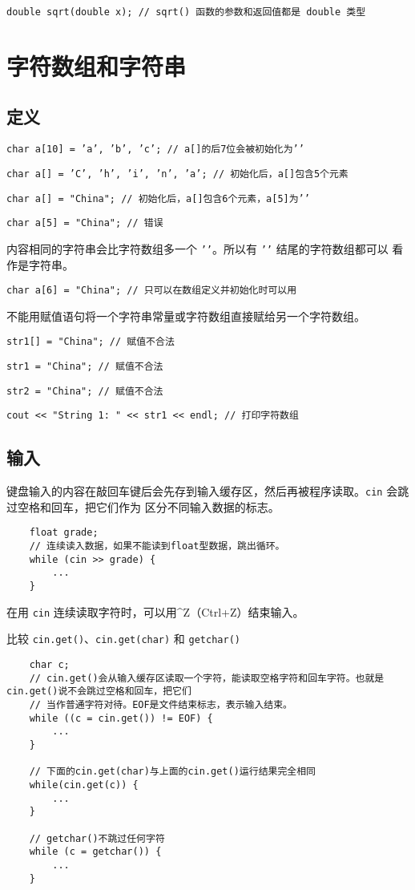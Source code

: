 \documentclass[UTF8]{ctexart}
\begin{document}
\texttt{double sqrt(double x);         // sqrt() 函数的参数和返回值都是 double 类型}

\section{字符数组和字符串}
\subsection{定义}
\texttt{char a[10] = {'a', 'b', 'c'};          // a[]的后7位会被初始化为'\0'}

\texttt{char a[] = {'C', 'h', 'i', 'n', 'a'};  // 初始化后，a[]包含5个元素}

\texttt{char a[] = "China";    // 初始化后，a[]包含6个元素，a[5]为'\0'}

\texttt{char a[5] = "China";   // 错误}

内容相同的字符串会比字符数组多一个 \texttt{'\0'}。所以有 \texttt{'\0'} 结尾的字符数组都可以
看作是字符串。

\texttt{char a[6] = "China";   // 只可以在数组定义并初始化时可以用}

不能用赋值语句将一个字符串常量或字符数组直接赋给另一个字符数组。

\texttt{str1[] = "China";      // 赋值不合法}

\texttt{str1 = "China";        // 赋值不合法}

\texttt{str2 = "China";        // 赋值不合法}

\texttt{cout << "String 1: " << str1 << endl; // 打印字符数组}

\subsection{输入}
键盘输入的内容在敲回车键后会先存到输入缓存区，然后再被程序读取。\texttt{cin} 会跳过空格和回车，把它们作为
区分不同输入数据的标志。
\begin{verbatim}
    float grade;
    // 连续读入数据，如果不能读到float型数据，跳出循环。
    while (cin >> grade) {
        ...
    }
\end{verbatim}

在用 \texttt{cin} 连续读取字符时，可以用\^{}Z（Ctrl+Z）结束输入。

比较 \texttt{cin.get()}、\texttt{cin.get(char)} 和 \texttt{getchar()}
\begin{verbatim}
    char c;
    // cin.get()会从输入缓存区读取一个字符，能读取空格字符和回车字符。也就是cin.get()说不会跳过空格和回车，把它们
    // 当作普通字符对待。EOF是文件结束标志，表示输入结束。
    while ((c = cin.get()) != EOF) {
        ...
    }

    // 下面的cin.get(char)与上面的cin.get()运行结果完全相同
    while(cin.get(c)) {
        ...
    }

    // getchar()不跳过任何字符
    while (c = getchar()) {
        ...
    }
\end{verbatim}
\end{document}

